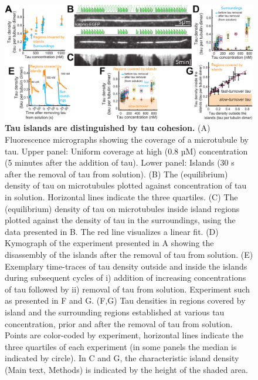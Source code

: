 \begin{figure}[b]
\centering
\includegraphics[width=1\linewidth]{Figures/tau_flushouts.png}
\caption[Tau islands are distinguished by tau cohesion.]{
\textbf{Tau islands are distinguished by tau cohesion.} (A) Fluorescence micrographs showing the coverage of a microtubule by tau. Upper panel: Uniform coverage at high (0.8 µM) concentration (5 minutes after the addition of tau). Lower panel: Islands (30 s after the removal of tau from solution). (B) The (equilibrium) density of tau on microtubules plotted against concentration of tau in solution. Horizontal lines indicate the three quartiles. (C) The (equilibrium) density of tau on microtubules inside island regions plotted against the density of tau in the surroundings, using the data presented in B. The red line visualizes a linear fit. (D) Kymograph of the experiment presented in A showing the disassembly of the islands after the removal of tau from solution. (E) Exemplary time-traces of tau density outside and inside the islands during subsequent cycles of i) addition of increasing concentrations of tau followed by ii) removal of tau from solution. Experiment such as presented in F and G. (F,G) Tau densities in regions covered by island and the surrounding regions established at various tau concentration, prior and after the removal of tau from solution. Points are color-coded by experiment, horizontal lines indicate the three quartiles of each experiment (in some panels the median is indicated by circle). In C and G, the characteristic island density (Main text, Methods) is indicated by the height of the shaded area.
	}\label{tauflushouts}
\end{figure}
